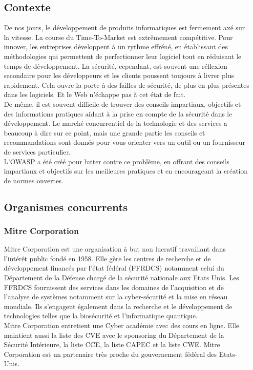 \subsection{Contexte}
De nos jours, le développement de produits informatiques est fermement axé sur la vitesse. La course du Time-To-Market est extrêmement compétitive. Pour innover, les entreprises développent à un rythme effréné, en établissant des méthodologies qui permettent de perfectionner leur logiciel tout en réduisant le temps de développement. La sécurité, cependant, est souvent une réflexion secondaire pour les développeurs et les clients poussent toujours à livrer plus rapidement. Cela ouvre la porte à des failles de sécurité, de plus en plus présentes dans les logiciels. Et le Web n’échappe pas à cet état de fait.\\ 
De même, il est souvent difficile de trouver des conseils impartiaux, objectifs et des informations pratiques aidant à la prise en compte de la sécurité dans le développement. Le marché concurrentiel de la technologie et des services a beaucoup à dire sur ce point, mais une grande partie les conseils et recommandations sont donnés pour vous orienter vers un outil ou un fournisseur de services particulier.\\
L'OWASP a été créé pour lutter contre ce problème, en offrant des conseils impartiaux et objectifs sur les meilleures pratiques et en encourageant la création de normes ouvertes.

\subsection{Organismes concurrents}
\subsubsection{Mitre Corporation}
Mitre Corporation est une organisation à but non lucratif travaillant dans l’intérêt public fondé en 1958. Elle gère les centres de recherche et de développement financés par l’état fédéral (FFRDCS) notamment celui du Département de la Défense chargé de la sécurité nationale aux Etats Unis. Les FFRDCS fournissent des services dans les domaines de l'acquisition et de l'analyse de systèmes notamment sur la cyber-sécurité et la mise en réseau mondiale. Ils s'engagent également dans la recherche et le développement de technologies telles que la biosécurité et l'informatique quantique.\\
Mitre Corporation entretient une Cyber académie avec des cours en ligne. Elle maintient aussi la liste des CVE avec le sponsoring du Département de la Sécurité Intérieure, la liste CCE, la liste CAPEC et la liste CWE. Mitre Corporation est un partenaire très proche du gouvernement fédéral des Etats-Unis.\\

